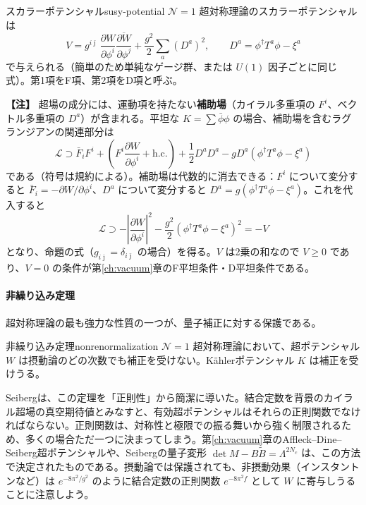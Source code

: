 \documentclass[uplatex, dvipdfmx, book]{jsbook}
\newenvironment{note}{\vspace{1ex}\par\footnotesize\noindent\textbf{【注】}}{\par\vspace{1ex}}
\begin{document}
\begin{myprop}{スカラーポテンシャル}{susy-potential}
$\mathcal{N} = 1$ 超対称理論のスカラーポテンシャルは
\begin{equation*}
    V = g^{i\bar\jmath}\,\frac{\partial W}{\partial\phi^i}\overline{\frac{\partial W}{\partial\phi^j}} + \frac{g^2}{2}\sum_a (D^a)^2, \qquad D^a = \phi^\dagger T^a \phi - \xi^a
\end{equation*}
で与えられる（簡単のため単純なゲージ群、または $U(1)$ 因子ごとに同じ式）。第1項をF項、第2項をD項と呼ぶ。
\end{myprop}

\begin{note}
超場の成分には、運動項を持たない\textbf{補助場}（カイラル多重項の $F^i$、ベクトル多重項の $D^a$）が含まれる。平坦な $K = \sum\bar\phi\phi$ の場合、補助場を含むラグランジアンの関連部分は
\begin{equation*}
    \mathcal{L} \supset \bar{F}_i F^i + \left( F^i \frac{\partial W}{\partial\phi^i} + \text{h.c.} \right) + \frac{1}{2}D^aD^a - g D^a\left( \phi^\dagger T^a\phi - \xi^a \right)
\end{equation*}
である（符号は規約による）。補助場は代数的に消去できる：$F^i$ について変分すると $\bar{F}_i = -\partial W/\partial\phi^i$、$D^a$ について変分すると $D^a = g(\phi^\dagger T^a\phi - \xi^a)$。これを代入すると
\begin{equation*}
    \mathcal{L} \supset -\left|\frac{\partial W}{\partial\phi^i}\right|^2 - \frac{g^2}{2}\left( \phi^\dagger T^a\phi - \xi^a \right)^2 = -V
\end{equation*}
となり、命題の式（$g_{i\bar\jmath} = \delta_{i\bar\jmath}$ の場合）を得る。$V$ は2乗の和なので $V \ge 0$ であり、$V = 0$ の条件が第\ref{ch:vacuum}章のF平坦条件・D平坦条件である。
\end{note}

\paragraph{非繰り込み定理}
超対称理論の最も強力な性質の一つが、量子補正に対する保護である。

\begin{mythm}{非繰り込み定理}{nonrenormalization}
$\mathcal{N} = 1$ 超対称理論において、超ポテンシャル $W$ は摂動論のどの次数でも補正を受けない。K\"ahlerポテンシャル $K$ は補正を受けうる。
\end{mythm}

Seibergは、この定理を「正則性」から簡潔に導いた\cite{seiberg1993}。結合定数を背景のカイラル超場の真空期待値とみなすと、有効超ポテンシャルはそれらの正則関数でなければならない。正則関数は、対称性と極限での振る舞いから強く制限されるため、多くの場合ただ一つに決まってしまう。第\ref{ch:vacuum}章のAffleck--Dine--Seiberg超ポテンシャルや、Seibergの量子変形 $\det M - B\tilde{B} = \Lambda^{2N_c}$ は、この方法で決定されたものである。摂動論では保護されても、非摂動効果（インスタントンなど）は $e^{-8\pi^2/g^2}$ のように結合定数の正則関数 $e^{-8\pi^2 f}$ として $W$ に寄与しうることに注意しよう。
\end{document}
